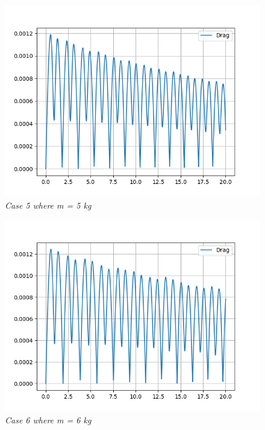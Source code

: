     \begin{figure}[H]
        \centering
        \includegraphics{Appendix/Derived Data Pictures/dm5.png}
        \caption{\textit{Case 5 where m = 5 kg}}
        \label{}
    \end{figure}
            
    \begin{figure}[H]
        \centering
        \includegraphics{Appendix/Derived Data Pictures/dm6.png}
        \caption{\textit{Case 6 where m = 6 kg}}
        \label{}
    \end{figure}
            
